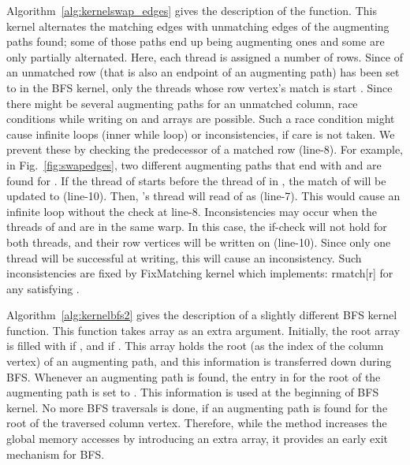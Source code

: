 \documentclass[11pt,a4paper]{article}
\newcommand{\fixinconsistent}{{\sc FixMatching}\xspace}
\newcommand{\altswap}{{\sc{Alternate}}\xspace}
\begin{document}
Algorithm~\ref{alg:kernelswap_edges} gives the description of the \altswap function. This kernel 
alternates the matching edges with unmatching edges of the augmenting paths found; some of those paths end up being augmenting ones and some are only partially alternated.
Here, each thread is assigned a number of rows. Since  of an unmatched row 
(that is also an endpoint of an augmenting path) has been set to  in the BFS kernel, 
only the threads whose row vertex's match
is  start \altswap. Since there might be 
several augmenting paths for an unmatched
column, race conditions while writing on
 and  arrays are possible. Such a race condition might cause
infinite loops (inner while loop) or inconsistencies, if care is not taken.  
We prevent these by checking the predecessor of a matched row 
(line-8). For example, in Fig.~\ref{fig:swapedges},
two different
augmenting paths that end with  and  are found for . If the thread
of  starts before the thread of  in \altswap, the match of  will be updated
to  (line-10). Then, 's thread will read  of 
as  (line-7). This would cause an infinite loop
without the check at line-8. Inconsistencies may occur when the
threads of  and  are in the same warp. In this case, 
the if-check will not hold for both threads, and their row vertices will
be written on  (line-10).
Since only one thread will be successful at writing, 
this will cause an inconsistency. Such inconsistencies are fixed
by \fixinconsistent{} kernel which implements: rmatch[r]  for any  satisfying .



Algorithm~\ref{alg:kernelbfs2} gives the description of a slightly different BFS kernel function.  
This function takes  array as an extra argument. Initially, the root array
is filled with  if , and  if .
This array holds the root (as the index of the column vertex) of an augmenting path, and this information is 
transferred down during BFS. Whenever an augmenting path is found, the entry in 
 for the root of the augmenting path is set to . 
This information is used at the beginning of BFS kernel. No more BFS traversals is done,
if an augmenting path is found for the root of the traversed column vertex. Therefore,
while the method increases the global memory accesses by introducing 
an extra array, it provides an early exit mechanism for BFS. 
\end{document}
